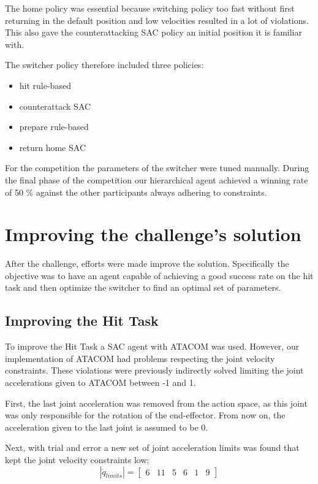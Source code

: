 The home policy was essential because switching policy too fast without first returning in the default position and low velocities resulted in a lot of violations.
This also gave the counterattacking SAC policy an initial position it is familiar with.

The switcher policy therefore included three policies:
\begin{itemize}
    \item hit rule-based
    \item counterattack SAC
    \item prepare rule-based
    \item return home SAC
\end{itemize}

For the competition the parameters of the switcher were tuned manually.
During the final phase of the competition our hierarchical agent achieved a winning rate of 50 \% against the other participants always adhering to constraints.

\section{Improving the challenge's solution}
After the challenge, efforts were made improve the solution. Specifically the objective was to have an agent capable of achieving a good success rate on the hit task
and then optimize the switcher to find an optimal set of parameters.

\subsection{Improving the Hit Task}
To improve the Hit Task a SAC agent with ATACOM was used. However, our implementation of ATACOM had problems respecting the joint velocity constraints.
These violations were previously indirectly solved limiting the joint accelerations given to ATACOM between -1 and 1.

First, the last joint acceleration was removed from the action space, as this joint was only responsible for the rotation of the end-effector.
From now on, the acceleration given to the last joint is assumed to be 0.

Next, with trial and error a new set of joint acceleration limits was found that kept the joint velocity constraints low:
\begin{equation*}
    |\ddot{q}_{limits}| = \begin{bmatrix} 6 & 11 & 5 & 6 & 1 & 9 \end{bmatrix}
\end{equation*}

